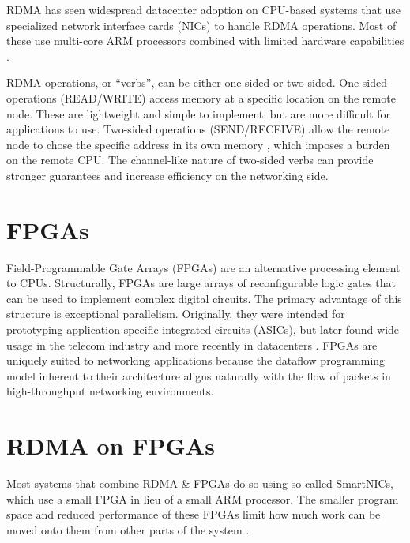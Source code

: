 RDMA has seen widespread datacenter adoption \autocite{strom,mencer-queue-2020} on CPU-based systems that use specialized network interface cards (NICs) to handle RDMA operations. Most of these use multi-core ARM processors combined with limited hardware capabilities \autocite{strom,honeycomb,rdma-reads}.

RDMA operations, or ``verbs'', can be either one-sided or two-sided. One-sided operations (READ/WRITE) access memory at a specific location on the remote node. These are lightweight and simple to implement, but are more difficult for applications to use. Two-sided operations (SEND/RECEIVE) allow the remote node to chose the specific address in its own memory \autocite{base}, which imposes a burden on the remote CPU. The channel-like nature of two-sided verbs can provide stronger guarantees and increase efficiency on the networking side.


\section{FPGAs}

Field-Programmable Gate Arrays (FPGAs) are an alternative processing element to CPUs. Structurally, FPGAs are large arrays of reconfigurable logic gates that can be used to implement complex digital circuits. The primary advantage of this structure is exceptional parallelism. Originally, they were intended for prototyping application-specific integrated circuits (ASICs), but later found wide usage in the telecom industry \autocite{mencer-queue-2020} and more recently in datacenters \autocite{mencer-queue-2020,hoozemans-cas-2021}. FPGAs are uniquely suited to networking applications because the dataflow programming model \autocite{hoozemans-cas-2021} inherent to their architecture aligns naturally with the flow of packets in high-throughput networking environments.


\section{RDMA on FPGAs}

Most systems that combine RDMA \& FPGAs do so using so-called SmartNICs, which use a small FPGA in lieu of a small ARM processor. The smaller program space and reduced performance of these FPGAs limit how much work can be moved onto them from other parts of the system \autocite{honeycomb}.

